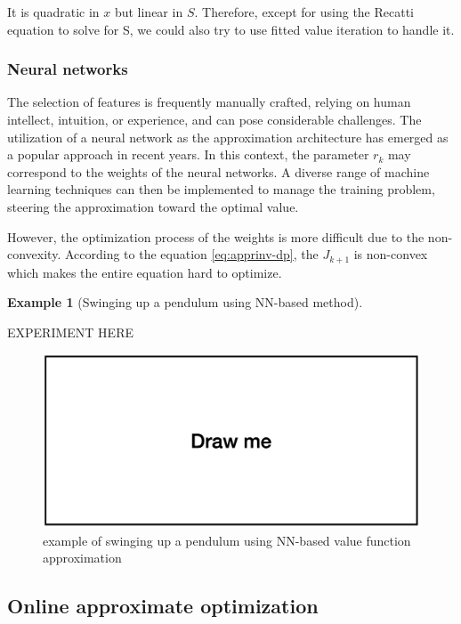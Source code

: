 \documentclass[
]{book}
\theoremstyle{definition}
\theoremstyle{definition}
\newtheorem{example}{Example}[chapter]
\theoremstyle{definition}
\theoremstyle{definition}
\theoremstyle{remark}
\begin{document}
It is quadratic in \(x\) but linear in \(S\). Therefore, except for using the Recatti equation to solve for S, we could also try to use fitted value iteration to handle it.

\hypertarget{neural-networks}{%
\subsubsection{Neural networks}\label{neural-networks}}

The selection of features is frequently manually crafted, relying on human intellect, intuition, or experience, and can pose considerable challenges. The utilization of a neural network as the approximation architecture has emerged as a popular approach in recent years. In this context, the parameter \(r_k\) may correspond to the weights of the neural networks. A diverse range of machine learning techniques can then be implemented to manage the training problem, steering the approximation toward the optimal value.

However, the optimization process of the weights is more difficult due to the non-convexity. According to the equation \eqref{eq:apprinv-dp}, the \(J_{k+1}\) is non-convex which makes the entire equation hard to optimize.

\begin{example}[Swinging up a pendulum using NN-based method]
\protect\hypertarget{exm:NNbasedswingingupapendulum}{}\label{exm:NNbasedswingingupapendulum}

{EXPERIMENT HERE}

\begin{figure}

{\centering \includegraphics[width=0.6\linewidth]{images/drawme} 

}

\caption{example of swinging up a pendulum using NN-based value function approximation}\label{fig:pendulum-NN-example}
\end{figure}

\end{example}

\hypertarget{online-approximate-optimization}{%
\subsection{Online approximate optimization}\label{online-approximate-optimization}}
\end{document}
